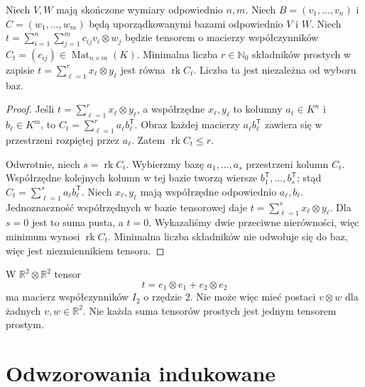 \begin{twierdzenie}
\label{thm:lin9-rzad}
Niech \(V,W\) mają skończone
wymiary odpowiednio \(n,m\).
Niech \(B=(v_1,\ldots,v_n)\)
i \(C=(w_1,\ldots,w_m)\)
będą uporządkowanymi bazami
odpowiednio \(V\) i \(W\).
Niech
\(t=\sum_{i=1}^{n}\sum_{j=1}^{m}
 c_{ij}v_i\otimes w_j\)
będzie tensorem o macierzy
współczynników
\(C_t=(c_{ij})\in\operatorname{Mat}_{n\times m}(K)\).
Minimalna liczba \(r\in\mathbb N_0\)
składników prostych w zapisie
\(t=\sum_{\ell=1}^r x_\ell\otimes y_\ell\)
jest równa \(\operatorname{rk}C_t\).
Liczba ta jest niezależna
od wyboru baz.
\end{twierdzenie}
\begin{proof}
Jeśli \(t=\sum_{\ell=1}^r
x_\ell\otimes y_\ell\),
a współrzędne \(x_\ell,y_\ell\)
to kolumny \(a_\ell\in K^n\)
i \(b_\ell\in K^m\), to
\(C_t=\sum_{\ell=1}^r
a_\ell b_\ell^{\mathsf T}\).
Obraz każdej macierzy
\(a_\ell b_\ell^{\mathsf T}\)
zawiera się w przestrzeni
rozpiętej przez \(a_\ell\).
Zatem \(\operatorname{rk}C_t\leq r\).

Odwrotnie, niech
\(s=\operatorname{rk}C_t\).
Wybierzmy bazę
\(a_1,\ldots,a_s\)
przestrzeni kolumn \(C_t\).
Współrzędne kolejnych kolumn
w tej bazie tworzą wiersze
\(b_1^{\mathsf T},\ldots,b_s^{\mathsf T}\);
stąd
\(C_t=\sum_{\ell=1}^s
a_\ell b_\ell^{\mathsf T}\).
Niech \(x_\ell,y_\ell\)
mają współrzędne odpowiednio
\(a_\ell,b_\ell\).
Jednoznaczność współrzędnych
w bazie tensorowej daje
\(t=\sum_{\ell=1}^s x_\ell\otimes y_\ell\).
Dla \(s=0\) jest to suma pusta,
a \(t=0\).
Wykazaliśmy dwie przeciwne
nierówności, więc minimum wynosi
\(\operatorname{rk}C_t\).
Minimalna liczba składników
nie odwołuje się do baz,
więc jest niezmiennikiem tensora.
\end{proof}

\begin{przyklad}
\label{prz:lin9-nieprosty}
W \(\mathbb R^2\otimes\mathbb R^2\)
tensor
\[
 t=e_1\otimes e_1+e_2\otimes e_2
\]
ma macierz współczynników \(I_2\)
o rzędzie \(2\).
Nie może więc mieć postaci
\(v\otimes w\) dla żadnych
\(v,w\in\mathbb R^2\).
Nie każda suma tensorów prostych
jest jednym tensorem prostym.
\end{przyklad}

\section{Odwzorowania indukowane}
\label{sec:lin9-mapy}

